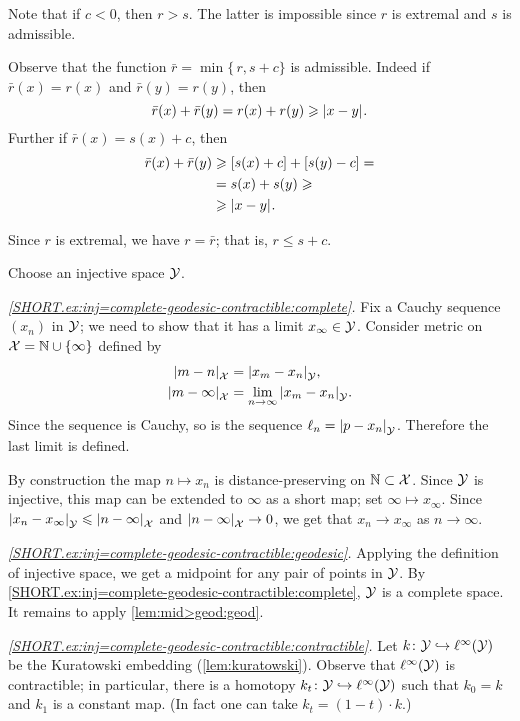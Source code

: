 Note that if $c<0$, then $r>s$.
The latter is impossible since $r$ is extremal and $s$ is admissible.

Observe that the function $\bar r=\min\{\,r,s+c\}$ is admissible.
Indeed if $\bar r(x)=r(x)$ and $\bar r(y)=r(y)$, then 
\[\bar r(x)+\bar r(y)=r(x)+ r(y)\ge \dist{x}{y}{}.\]
Further if $\bar r(x)=s(x)+c$, then 
\begin{align*}
\bar r(x)+\bar r(y)&\ge [s(x)+c]+ [s(y)-c]= 
\\
&=s(x)+s(y) \ge 
\\
&\ge\dist{x}{y}{}.
\end{align*}

Since $r$ is extremal, we have $r=\bar r$;
that is, $r\le s+c$.

Choose an injective space $\mathcal{Y}$.

\textit{\ref{SHORT.ex:inj=complete-geodesic-contractible:complete}.}
Fix a Cauchy sequence $(x_n)$ in $\mathcal{Y}$;
we need to show that it has a limit $x_\infty\in \mathcal{Y}$.
Consider metric on $\mathcal{X}=\mathbb{N}\cup\{\infty\}$ defined by 
\begin{align*}
\dist{m}{n}{\spc{X}}&=\dist{x_m}{x_n}{\spc{Y}},
\\
\dist{m}{\infty}{\spc{X}}&=\lim_{n\to\infty}\dist{x_m}{x_n}{\spc{Y}}.
\end{align*}
Since the sequence is Cauchy, so is the sequence $\ell_n=\dist{p}{x_n}{\spc{Y}}$.
Therefore the last limit is defined.

By construction the map $n\mapsto x_n$ is distance-preserving on $\mathbb{N}\subset \mathcal{X}$.
Since $\mathcal{Y}$ is injective, this map can be extended to $\infty$ as a short map; set $\infty\mapsto x_\infty$.
Since $\dist{x_n}{x_\infty}{\spc{Y}}\le \dist{n}{\infty}{\spc{X}}$ 
and $\dist{n}{\infty}{\spc{X}}\to 0$, we get that
$x_n\to x_\infty$ as $n\to\infty$.

\textit{\ref{SHORT.ex:inj=complete-geodesic-contractible:geodesic}.}
Applying the definition of injective space, we get a midpoint for any pair of points in $\mathcal{Y}$.
By \ref{SHORT.ex:inj=complete-geodesic-contractible:complete},
$\mathcal{Y}$ is a complete space.
It remains to apply \ref{lem:mid>geod:geod}.

\textit{\ref{SHORT.ex:inj=complete-geodesic-contractible:contractible}.}
Let $k\colon\mathcal{Y}\hookrightarrow \ell^\infty(\mathcal{Y})$ be the Kuratowski embedding (\ref{lem:kuratowski}).
Observe that $\ell^\infty(\mathcal{Y})$ is contractible;
in particular, there is a homotopy $k_t\colon\mathcal{Y}\hookrightarrow \ell^\infty(\mathcal{Y})$ such that $k_0=k$ and $k_1$ is a constant map.
(In fact one can take $k_t=(1-t)\cdot k$.)

